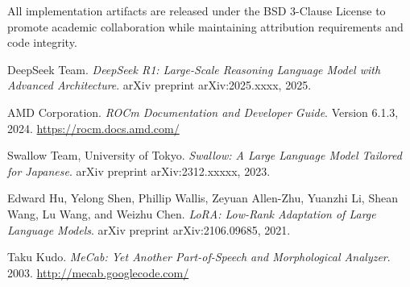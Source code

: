 \documentclass[12pt,a4paper]{article}
\begin{document}
All implementation artifacts are released under the BSD 3-Clause License to promote academic collaboration while maintaining attribution requirements and code integrity.


\begin{thebibliography}{9}

DeepSeek Team.
\textit{DeepSeek R1: Large-Scale Reasoning Language Model with Advanced Architecture}.
arXiv preprint arXiv:2025.xxxx, 2025.

AMD Corporation.
\textit{ROCm Documentation and Developer Guide}.
Version 6.1.3, 2024.
\url{https://rocm.docs.amd.com/}

Swallow Team, University of Tokyo.
\textit{Swallow: A Large Language Model Tailored for Japanese}.
arXiv preprint arXiv:2312.xxxxx, 2023.

Edward Hu, Yelong Shen, Phillip Wallis, Zeyuan Allen-Zhu, Yuanzhi Li, Shean Wang, Lu Wang, and Weizhu Chen.
\textit{LoRA: Low-Rank Adaptation of Large Language Models}.
arXiv preprint arXiv:2106.09685, 2021.

Taku Kudo.
\textit{MeCab: Yet Another Part-of-Speech and Morphological Analyzer}.
2003.
\url{http://mecab.googlecode.com/}

\end{thebibliography}
\end{document}
